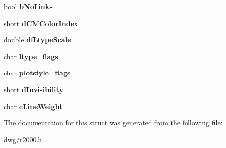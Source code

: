 \begin{DoxyCompactItemize}
\item 
bool {\bfseries b\+No\+Links}\hypertarget{struct_d_w_g2000_ced_a7e9475187080611330450d90679ad86d}{}\label{struct_d_w_g2000_ced_a7e9475187080611330450d90679ad86d}

\item 
short {\bfseries d\+C\+M\+Color\+Index}\hypertarget{struct_d_w_g2000_ced_ab76c8244592d911958f050d535347682}{}\label{struct_d_w_g2000_ced_ab76c8244592d911958f050d535347682}

\item 
double {\bfseries df\+Ltype\+Scale}\hypertarget{struct_d_w_g2000_ced_a4f7add643c57e47a9a99e1796e625899}{}\label{struct_d_w_g2000_ced_a4f7add643c57e47a9a99e1796e625899}

\item 
char {\bfseries ltype\+\_\+flags}\hypertarget{struct_d_w_g2000_ced_a8a5a84397b0b74245c55d30ebe77ba56}{}\label{struct_d_w_g2000_ced_a8a5a84397b0b74245c55d30ebe77ba56}

\item 
char {\bfseries plotstyle\+\_\+flags}\hypertarget{struct_d_w_g2000_ced_a4041769bd176132ca1f349c63b2fc8b3}{}\label{struct_d_w_g2000_ced_a4041769bd176132ca1f349c63b2fc8b3}

\item 
short {\bfseries d\+Invisibility}\hypertarget{struct_d_w_g2000_ced_a8b202c81ce4e303edae90ff0a0a64b9a}{}\label{struct_d_w_g2000_ced_a8b202c81ce4e303edae90ff0a0a64b9a}

\item 
char {\bfseries c\+Line\+Weight}\hypertarget{struct_d_w_g2000_ced_a509afa39c3662359e66f863d2030f1de}{}\label{struct_d_w_g2000_ced_a509afa39c3662359e66f863d2030f1de}

\end{DoxyCompactItemize}


The documentation for this struct was generated from the following file\+:\begin{DoxyCompactItemize}
\item 
dwg/r2000.\+h\end{DoxyCompactItemize}
